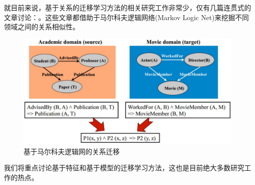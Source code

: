 就目前来说，基于关系的迁移学习方法的相关研究工作非常少，仅有几篇连贯式的文章讨论：\cite{mihalkova2007mapping,mihalkova2008transfer,davis2009deep}。这些文章都借助于马尔科夫逻辑网络(Markov Logic Net)来挖掘不同领域之间的关系相似性。

\begin{figure}[htbp]
	\centering
	\includegraphics[scale=0.3]{./figures/fig-method-relation2.pdf}
	\caption{基于马尔科夫逻辑网的关系迁移}
	\label{fig-method-relation2}
\end{figure}

我们将重点讨论基于特征和基于模型的迁移学习方法，这也是目前绝大多数研究工作的热点。